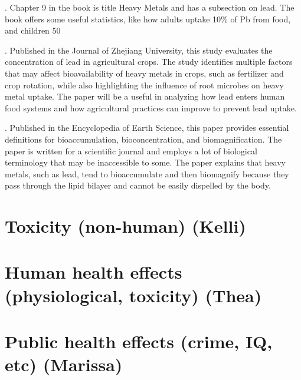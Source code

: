 \documentclass{article}\usepackage[]{graphicx}\usepackage[]{color}
\begin{document}
.
Chapter 9 in the book is title Heavy Metals and has a subsection on lead. The book offers some useful statistics, like how adults uptake 10\% of Pb from food, and children 50%

.
Published in the Journal of Zhejiang University, this study evaluates the concentration of lead in agricultural crops. The study identifies multiple factors that may affect bioavailability of heavy metals in crops, such as fertilizer and crop rotation, while also highlighting the influence of root microbes on heavy metal uptake. The paper will be a useful in analyzing how lead enters human food systems and how agricultural practices can improve to prevent lead uptake. 

.
Published in the Encyclopedia of Earth Science, this paper provides essential definitions for bioaccumulation, bioconcentration, and biomagnification. The paper is written for a scientific journal and employs a lot of biological terminology that may be inaccessible to some. The paper explains that heavy metals, such as lead, tend to bioaccumulate and then biomagnify because they pass through the lipid bilayer and cannot be easily dispelled by the body. 


\section{Toxicity (non-human) (Kelli)}

\section{Human health effects (physiological, toxicity) (Thea)}

\section{Public health effects (crime, IQ, etc) (Marissa)}
\end{document}
